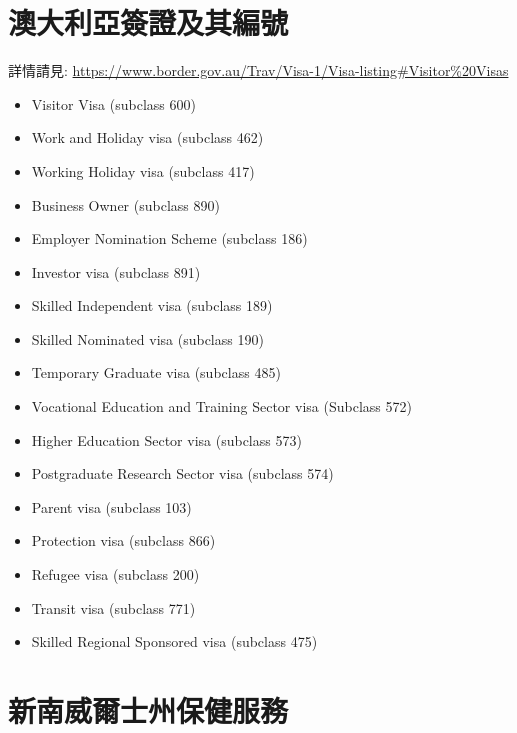 \section{澳大利亞簽證及其編號}
詳情請見: \url{https://www.border.gov.au/Trav/Visa-1/Visa-listing#Visitor%20Visas}
\begin{itemize}
  \itemsep0em
  \item Visitor Visa (subclass 600)
  \item Work and Holiday visa (subclass 462)
  \item Working Holiday visa (subclass 417)
  \item Business Owner (subclass 890)
  \item Employer Nomination Scheme (subclass 186)
  \item Investor visa (subclass 891)
  \item Skilled Independent visa (subclass 189)
  \item Skilled Nominated visa (subclass 190)
  \item Temporary Graduate visa (subclass 485)
  \item Vocational Education and Training Sector visa (Subclass 572)
  \item Higher Education Sector visa (subclass 573)
  \item Postgraduate Research Sector visa (subclass 574)
  \item Parent visa (subclass 103)
  \item Protection visa (subclass 866)
  \item Refugee visa (subclass 200)
  \item Transit visa (subclass 771)
  \item Skilled Regional Sponsored visa (subclass 475)
\end{itemize}

\section{新南威爾士州保健服務}
